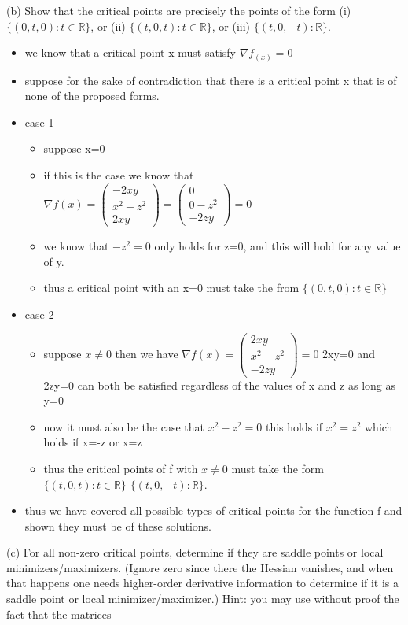 \documentclass[10pt]{article}
\begin{document}
(b) Show that the critical points are precisely the points of the form (i) $\{(0, t, 0): t \in \mathbb{R}\}$, or (ii) $\{(t, 0, t): t \in \mathbb{R}\}$, or (iii) $\{(t, 0,-t): \mathbb{R}\}$.
\begin{itemize}
    \item we know that a critical point x must satisfy $\nabla f_(x)=0$
    \item suppose for the sake of contradiction that there is a critical point x that is of none of the proposed forms. 
    \item case 1 
    \begin{itemize}
        \item suppose x=0
        \item if this is the case we know that $\nabla f(x)=\begin{pmatrix}
        -2xy\\x^2-z^2\\2xy
    \end{pmatrix}=\begin{pmatrix}
        0\\0-z^2\\-2zy
    \end{pmatrix}=0$
    \item we know that $-z^2=0$ only holds for z=0, and this will hold for any value of y. \item thus a critical point with an x=0 must take the from $\{(0, t, 0): t \in \mathbb{R}\}$
    \end{itemize}
    \item case 2
    \begin{itemize}
        \item suppose $x\neq 0$ then we have 
         $\nabla f(x)=\begin{pmatrix}
        2xy\\x^2-z^2\\-2zy
    \end{pmatrix}=0$  2xy=0 and 2zy=0 can both be satisfied regardless of the values of x and z as long as y=0
    \item now it must also be the case that $x^2-z^2=0$ this holds if $x^2=z^2$ which holds if x=-z or x=z
    \item thus the critical points of f with $x\neq 0$ must take the form $\{(t, 0, t): t \in \mathbb{R}\}$ $\{(t, 0,-t): \mathbb{R}\}$.
    \end{itemize}
    \item thus we have covered all possible types of critical points for the function f and shown they must be of these solutions.
\end{itemize}
(c) For all non-zero critical points, determine if they are saddle points or local minimizers/maximizers. (Ignore zero since there the Hessian vanishes, and when that happens one needs higher-order derivative information to determine if it is a saddle point or local minimizer/maximizer.) Hint: you may use without proof the fact that the matrices
\end{document}
